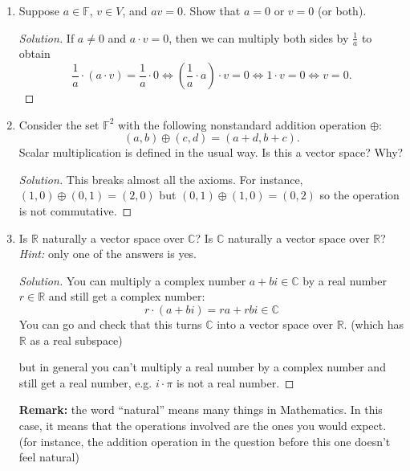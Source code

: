 \documentclass[a4paper,11pt]{article}
\theoremstyle{definition}
\newenvironment{solution}
  {\renewcommand\qedsymbol{$\blacksquare$}\begin{proof}[Solution]}
  {\end{proof}}
\begin{document}
\begin{enumerate}[(1)]
\begin{solution}
Another solution: we saw that $-v = (-1)\cdot v$, so $-(-v) = (-1)\cdot((-1)\cdot v = ((-1)(-1))\cdot v = 1\cdot v = v$ where we used distributivity and unitality of scalar multiplication.
\end{solution}
\item
Suppose $a\in\mathbb F$, $v\in V$, and $av = 0$.
Show that $a=0$ or $v=0$ (or both).
\begin{solution}
If $a\neq 0$ and $a\cdot v = 0$, then we can multiply both sides by $\frac{1}{a}$ to obtain
\[
\frac{1}{a}\cdot(a\cdot v) = \frac{1}{a}\cdot 0 \iff \left(\frac{1}{a}\cdot a\right)\cdot v = 0\iff
1\cdot v = 0 \iff v = 0.
\]
\end{solution}
\item 
Consider the set $\mathbb F^2$ with the following nonstandard addition operation $\oplus$:
\[
(a,b)\oplus(c,d) = (a+d,b+c).
\]
Scalar multiplication is defined in the usual way. Is this a vector space? Why?
\begin{solution}
This breaks almost all the axioms.
For instance, $(1,0)\oplus(0,1) = (2,0)$ but $(0,1)\oplus(1,0) = (0,2)$ so the operation is not commutative.
\end{solution}
\item 
Is $\mathbb R$ naturally a vector space over $\mathbb C$?
Is $\mathbb C$ naturally a vector space over $\mathbb R$?
\textit{Hint:} only one of the answers is yes.
\begin{solution}
You can multiply a complex number $a+bi\in\mathbb C$ by a real number $r\in\mathbb R$ and still get a complex number:
\[
r\cdot(a+bi) = ra+rbi \in \mathbb C
\]
You can go and check that this turns $\mathbb C$ into a vector space over $\mathbb R$. (which has $\mathbb R$ as a real subspace)

but in general you can't multiply a real number by a complex number and still get a real number, e.g. $i\cdot\pi$ is not a real number.
\end{solution}


\noindent
\textbf{Remark:}
the word ``natural'' means many things in Mathematics.
In this case, it means that the operations involved are the ones you would expect.
(for instance, the addition operation in the question before this one doesn't feel natural)


\end{enumerate}
\end{document}
